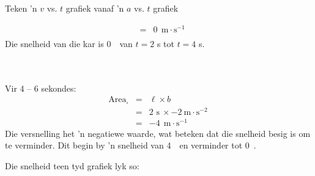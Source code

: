 \begin{wex}{Teken 'n $v$ vs. $t$ grafiek vanaf 'n $a$ vs. $t$ grafiek}
{\begin{minipage}{0.3\textwidth}
\begin{eqnarray*}
&=&0\ ~\text{m}\cdot \text{s}^{-1}\\
\end{eqnarray*}
Die snelheid van die kar is 0~\ms ~van $t=2$ s tot $t=4$ s.\\
\\
\\
\end{minipage}
\begin{minipage}{0.03\textwidth}
\begin{center}
\end{center}
\end{minipage}
\begin{minipage}{0.3\textwidth}
Vir 4 -- 6 sekondes:
\begin{eqnarray*}
\text{Area}_{\square} &=& \ell \times b\\
&=& 2\text{~s}\ \times -2~\text{m}\cdot \text{s}^{-2}\ \\
&=&-4\ ~\text{m}\cdot \text{s}^{-1}
\end{eqnarray*}
Die versnelling het 'n negatiewe waarde, wat beteken dat die snelheid besig is om te verminder. Dit begin by 'n snelheid van 4~\ms ~en verminder tot 0~\ms.\\
\end{minipage}

\begin{minipage}{0.3\textwidth}
Die snelheid teen tyd grafiek lyk so:
\end{minipage}
\begin{minipage}{0.7\textwidth}
\begin{center}
\end{center}
\end{minipage}
}
\end{wex}

